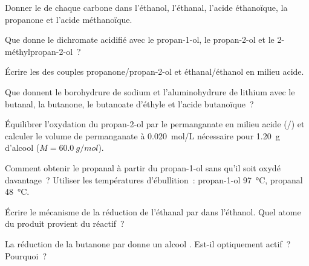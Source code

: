 \begin{exercise}[$\star$]\label{exo:b1:organic-redox:1}
Donner le  de chaque carbone dans l'éthanol,
l'éthanal, l'acide éthanoïque, la propanone et l'acide méthanoïque.
\end{exercise}

\begin{exercise}[$\star$]\label{exo:b1:organic-redox:2}
Que donne le dichromate acidifié avec le propan-1-ol, le propan-2-ol et
le 2-méthylpropan-2-ol~?
\end{exercise}

\begin{exercise}[$\star$]\label{exo:b1:organic-redox:3}
Écrire les  des couples propanone/propan-2-ol et
éthanal/éthanol en milieu acide.
\end{exercise}

\begin{exercise}[$\star$]\label{exo:b1:organic-redox:4}
Que donnent le borohydrure de sodium et l'aluminohydrure de lithium avec
le butanal, la butanone, le butanoate d'éthyle et l'acide butanoïque~?
\end{exercise}

\begin{exercise}[$\star\star$]\label{exo:b1:organic-redox:5}
Équilibrer l'oxydation du propan-2-ol par le permanganate en milieu
acide (/) et calculer le volume de permanganate à
\qty{0.020}{mol/L} nécessaire pour \qty{1.20}{g} d'alcool ($M = \qty{60.0}{g/mol}$).
\end{exercise}

\begin{exercise}[$\star\star$]\label{exo:b1:organic-redox:6}
Comment obtenir le propanal à partir du propan-1-ol sans qu'il soit
oxydé davantage~? Utiliser les températures d'ébullition~: propan-1-ol
\qty{97}{\celsius}, propanal
\qty{48}{\celsius}.
\end{exercise}

\begin{exercise}[$\star\star$]\label{exo:b1:organic-redox:7}
Écrire le mécanisme de la réduction de l'éthanal par  dans
l'éthanol. Quel atome du produit provient du réactif~?
\end{exercise}

\begin{exercise}[$\star\star$]\label{exo:b1:organic-redox:8}
La réduction de la butanone par  donne un alcool .
Est-il optiquement actif~? Pourquoi~?
\end{exercise}

